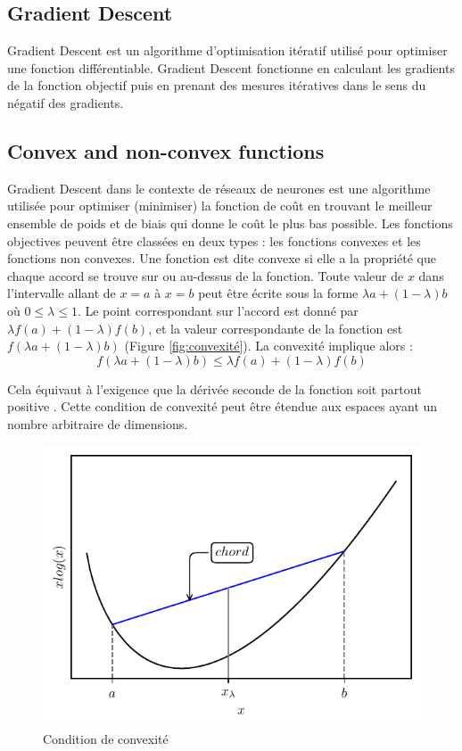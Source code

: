 \subsection{Gradient Descent}
Gradient Descent est un algorithme d'optimisation itératif utilisé pour optimiser une fonction différentiable. Gradient Descent fonctionne en calculant les gradients de la fonction objectif puis en prenant des mesures itératives dans le sens du négatif des gradients.

\subsection{Convex and non-convex functions}

Gradient Descent dans le contexte de réseaux de neurones est une algorithme utilisée pour optimiser (minimiser) la fonction de coût en trouvant le meilleur ensemble de poids et de biais qui donne le coût le plus bas possible. Les fonctions objectives peuvent être classées en deux types : les fonctions convexes et les fonctions non convexes.
Une fonction est dite convexe si elle a la propriété que chaque accord se trouve sur ou au-dessus de la fonction. Toute valeur de $x$ dans l'intervalle allant de $x=a$ à $x=b$ peut être écrite sous la forme $\lambda a+(1-\lambda)b$ où $0\leq\lambda\leq 1$. Le point correspondant sur l'accord est donné par $\lambda f(a)+(1-\lambda)f(b)$, et la valeur correspondante de la fonction est $f(\lambda a+(1-\lambda)b)$ (Figure \ref{fig:convexité}). La convexité implique alors :
\begin{equation}
    f(\lambda a+(1-\lambda)b)\leq \lambda f(a)+(1-\lambda)f(b)
    \label{equation:convexité}
\end{equation}

Cela équivaut à l'exigence que la dérivée seconde de la fonction soit partout positive \cite{Bishop2006}. Cette condition de convexité peut être étendue aux espaces ayant un nombre arbitraire de dimensions.

\begin{figure}[h]
    \centering
    \includegraphics{figures/convex_function.pdf}
    \caption{Condition de convexité}
    \label{fig:convexity}
\end{figure}

